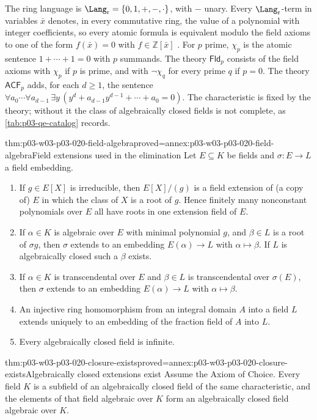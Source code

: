 The ring language is \(\Lang_{\mathrm r}=\{0,1,+,-,\cdot\}\), with \(-\)
unary. Every \(\Lang_{\mathrm r}\)-term in variables \(\bar x\) denotes, in
every commutative ring, the value of a polynomial with integer coefficients,
so every atomic formula is equivalent modulo the field axioms to one of the
form \(f(\bar x)=0\) with \(f\in\mathbb Z[\bar x]\)
\cite[Remark~2.26, p.~19]{Kruckman2020}. For \(p\) prime, \(\chi_p\) is the
atomic sentence \(1+\cdots+1=0\) with \(p\) summands. The theory
\(\mathsf{Fld}_p\) consists of the field axioms with \(\chi_p\) if \(p\) is
prime, and with \(\neg\chi_q\) for every prime \(q\) if \(p=0\). The theory
\(\mathsf{ACF}_p\) adds, for each \(d\ge1\), the sentence
\(\forall a_0\cdots\forall a_{d-1}\,\exists y\,
(y^d+a_{d-1}y^{d-1}+\cdots+a_0=0)\). The characteristic is fixed by the
theory; without it the class of algebraically closed fields is not complete,
as \cref{tab:p03-qe-catalog} records.

\begin{hblemma}{thm:p03-w03-p03-020-field-algebra}{proved=annex:p03-w03-p03-020-field-algebra}{Field extensions used in the elimination}
Let \(E\subseteq K\) be fields and \(\sigma:E\to L\) a field embedding.
\begin{enumerate}
\item If \(g\in E[X]\) is irreducible, then \(E[X]/(g)\) is a field
  extension of (a copy of) \(E\) in which the class of \(X\) is a root of
  \(g\). Hence finitely many nonconstant polynomials over \(E\) all have
  roots in one extension field of \(E\).
\item If \(\alpha\in K\) is algebraic over \(E\) with minimal polynomial
  \(g\), and \(\beta\in L\) is a root of \(\sigma g\), then \(\sigma\)
  extends to an embedding \(E(\alpha)\to L\) with \(\alpha\mapsto\beta\).
  If \(L\) is algebraically closed such a \(\beta\) exists.
\item If \(\alpha\in K\) is transcendental over \(E\) and \(\beta\in L\)
  is transcendental over \(\sigma(E)\), then \(\sigma\) extends to an
  embedding \(E(\alpha)\to L\) with \(\alpha\mapsto\beta\).
\item An injective ring homomorphism from an integral domain \(A\) into a
  field \(L\) extends uniquely to an embedding of the fraction field of
  \(A\) into \(L\).
\item Every algebraically closed field is infinite.
\end{enumerate}
\end{hblemma}

\begin{hbtheorem}{thm:p03-w03-p03-020-closure-exists}{proved=annex:p03-w03-p03-020-closure-exists}{Algebraically closed extensions exist}
Assume the Axiom of Choice. Every field \(K\) is a subfield of an
algebraically closed field of the same characteristic, and the elements of
that field algebraic over \(K\) form an algebraically closed field
algebraic over \(K\).
\end{hbtheorem}

